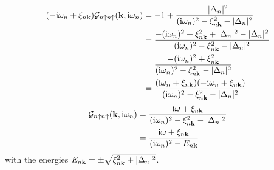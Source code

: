\documentclass[../main.tex]{subfiles}
\begin{document}
\begin{align}
    (-\mathrm{i} \omega_n + \xi_{n \bm{\mathrm{k}}}) \mathcal{G}_{n \uparrow n \uparrow} (\bm{\mathrm{k}}, \mathrm{i} \omega_n) &= -1 + \frac{-\vert\Delta_{n}\vert^2}{(\mathrm{i} \omega_n)^2 - \xi_{n \bm{\mathrm{k}}}^2 - \vert\Delta_{n}\vert^2} \\
    &= \frac{-(\mathrm{i} \omega_n)^2 + \xi_{n \bm{\mathrm{k}}}^2 + \vert\Delta_{n}\vert^2 -\vert\Delta_{n}\vert^2}{(\mathrm{i} \omega_n)^2 - \xi_{n \bm{\mathrm{k}}}^2 - \vert\Delta_{n}\vert^2} \\
    &= \frac{-(\mathrm{i} \omega_n)^2 + \xi_{n \bm{\mathrm{k}}}^2}{(\mathrm{i} \omega_n)^2 - \xi_{n \bm{\mathrm{k}}}^2 - \vert\Delta_{n}\vert^2} \\
    &= \frac{(\mathrm{i} \omega_n + \xi_{n \bm{\mathrm{k}}})(-\mathrm{i} \omega_n + \xi_{n \bm{\mathrm{k}}})}{(\mathrm{i} \omega_n)^2 - \xi_{n \bm{\mathrm{k}}}^2 - \vert\Delta_{n}\vert^2}
\end{align}
\begin{align}
    \mathcal{G}_{n \uparrow n \uparrow} (\bm{\mathrm{k}}, \mathrm{i} \omega_n) &= \frac{\mathrm{i} \omega + \xi_{n \bm{\mathrm{k}}}}{(\mathrm{i} \omega_n)^2 - \xi_{n \bm{\mathrm{k}}}^2 - \vert\Delta_{n}\vert^2} \\
    &= \frac{\mathrm{i} \omega + \xi_{n \bm{\mathrm{k}}}}{(\mathrm{i} \omega_n)^2 - E_{n \bm{\mathrm{k}}}}
\end{align}
with the energies \(E_{n \bm{\mathrm{k}}} = \pm \sqrt{\xi_{n \bm{\mathrm{k}}}^2 + \vert\Delta_{n}\vert^2}\).
\end{document}
